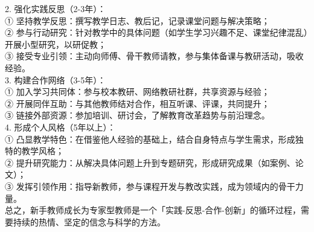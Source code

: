 \documentclass[12pt,a4paper]{article}
\begin{document}
2. 强化实践反思（2-3年）：\\
① 坚持教学反思：撰写教学日志、教后记，记录课堂问题与解决策略；\\
② 参与行动研究：针对教学中的具体问题（如学生学习兴趣不足、课堂纪律混乱）开展小型研究，以研促教；\\
③ 接受专业引领：主动向师傅、骨干教师请教，参与集体备课与教研活动，吸收经验。\\

3. 构建合作网络（3-5年）：\\
① 加入学习共同体：参与校本教研、网络教研社群，共享资源与经验；\\
② 开展同伴互助：与其他教师结对合作，相互听课、评课，共同提升；\\
③ 链接外部资源：参加培训、研讨会，了解教育改革趋势与前沿理念。\\

4. 形成个人风格（5年以上）：\\
① 凸显教学特色：在借鉴他人经验的基础上，结合自身特点与学生需求，形成独特的教学风格；\\
② 提升研究能力：从解决具体问题上升到专题研究，形成研究成果（如案例、论文）；\\
③ 发挥引领作用：指导新教师，参与课程开发与教改实践，成为领域内的骨干力量。\\

总之，新手教师成长为专家型教师是一个「实践-反思-合作-创新」的循环过程，需要持续的热情、坚定的信念与科学的方法。
\end{document}
